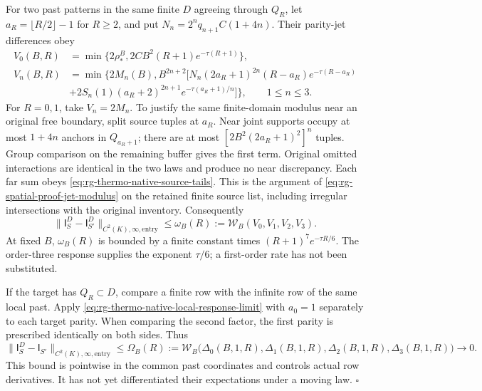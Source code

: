 For two past patterns in the same finite \(D\) agreeing through \(Q_R\),
let \(a_R=\lfloor R/2\rfloor-1\) for \(R\ge2\), and put
\(N_n=2^nq_{n+1}C(1+4n)\). Their parity-jet differences obey
\begin{equation}
 \begin{split}
 V_0(B,R)&=\min\{2\rho_*^B,2CB^2(R+1)e^{-\tau(R+1)}\},\\
 V_n(B,R)&=\min\bigl\{2M_n(B),B^{2n+2}\bigl[
 N_n(2a_R+1)^{2n}(R-a_R)e^{-\tau(R-a_R)}\\
 &+2S_n(1)(a_R+2)^{2n+1}e^{-\tau(a_R+1)/n}\bigr]\bigr\},
 \qquad 1\le n\le3.
 \end{split}
 \label{eq:rg-thermo-native-past-jet-modulus}
\end{equation}
For \(R=0,1\), take \(V_n=2M_n\). To justify the same finite-domain
modulus near an original free boundary, split source tuples at \(a_R\).
Near joint supports occupy at most \(1+4n\) anchors in \(Q_{a_R+1}\);
there are at most \([2B^2(2a_R+1)^2]^n\) tuples. Group comparison on
the remaining buffer gives the first term. Original omitted interactions
are identical in the two laws and produce no near discrepancy. Each far
sum obeys \cref{eq:rg-thermo-native-source-tails}. This is the argument
of \cref{eq:rg-spatial-proof-jet-modulus} on the retained finite source
list, including irregular intersections with the original inventory.
Consequently
\begin{equation}
 \|\mathsf I^D_S-\mathsf I^D_{S'}\|_{C^2(K),\infty,\mathrm{entry}}
 \le\omega_B(R):=\mathcal W_B(V_0,V_1,V_2,V_3).
 \label{eq:rg-thermo-native-past-fisher-modulus}
\end{equation}
At fixed \(B\), \(\omega_B(R)\) is bounded by a finite constant times
\((R+1)^7e^{-\tau R/6}\). The order-three response supplies the exponent
\(\tau/6\); a first-order rate has not been substituted.

If the target has \(Q_R\subset D\), compare a finite row with the
infinite row of the same local past. Apply
\cref{eq:rg-thermo-native-local-response-limit} with \(a_0=1\) separately
to each target parity. When comparing the second factor, the first parity
is prescribed identically on both sides. Thus
\begin{equation}
 \|\mathsf I^D_S-\mathsf I_{S'}\|_{C^2(K),\infty,\mathrm{entry}}
 \le\Omega_B(R):=\mathcal W_B\bigl(
 \Delta_0(B,1,R),\Delta_1(B,1,R),\Delta_2(B,1,R),\Delta_3(B,1,R)\bigr)
 \longrightarrow0.
 \label{eq:rg-thermo-native-free-row-comparison}
\end{equation}
This bound is pointwise in the common past coordinates and controls actual
row derivatives. It has not yet differentiated their expectations under
a moving law. \hfill\(\square\)

